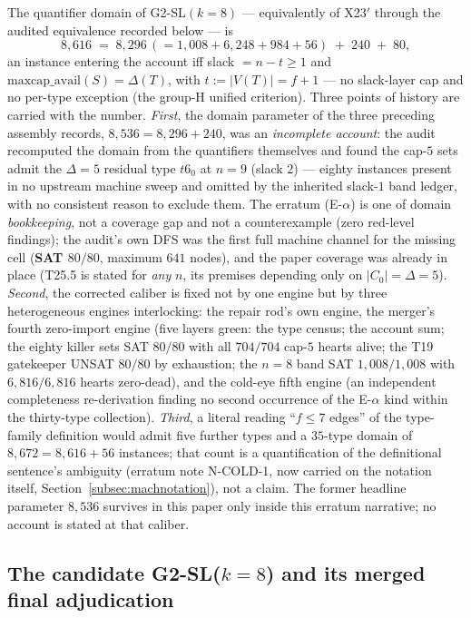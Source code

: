 The quantifier domain of G2-SL$(k{=}8)$ --- equivalently of X23$'$ through the audited
equivalence recorded below --- is
\[
8{,}616 \;=\; 8{,}296\,(=1{,}008+6{,}248+984+56)\;+\;240\;+\;80 ,
\]
an instance entering the account iff slack $=n-t\ge1$ and
$\mathrm{maxcap\_avail}(S)=\Delta(T)$, with $t:=|V(T)|=f+1$ --- no slack-layer cap and no
per-type exception (the group-H unified criterion). Three points of history are carried with
the number. \emph{First}, the domain parameter of the three preceding assembly records,
$8{,}536=8{,}296+240$, was an \emph{incomplete account}: the audit recomputed the domain from
the quantifiers themselves and found the cap-$5$ sets admit the $\Delta=5$ residual type
$t6_0$ at $n=9$ (slack $2$) --- eighty instances present in no upstream machine sweep and
omitted by the inherited slack-$1$ band ledger, with no consistent reason to exclude them.
The erratum (E-$\alpha$) is one of domain \emph{bookkeeping}, not a coverage gap and not a
counterexample (zero red-level findings); the audit's own DFS was the first full machine
channel for the missing cell (\textbf{SAT $80/80$}, maximum $641$ nodes), and the paper
coverage was already in place (T25.5 is stated for \emph{any} $n$, its premises depending
only on $|C_0|=\Delta=5$). \emph{Second}, the corrected caliber is fixed not by one engine
but by three heterogeneous engines interlocking: the repair rod's own engine, the merger's
fourth zero-import engine (five layers green: the type census; the account sum; the eighty
killer sets SAT $80/80$ with all $704/704$ cap-$5$ hearts alive; the T19 gatekeeper UNSAT
$80/80$ by exhaustion; the $n=8$ band SAT $1{,}008/1{,}008$ with $6{,}816/6{,}816$ hearts
zero-dead), and the cold-eye fifth engine (an independent completeness re-derivation finding
no second occurrence of the E-$\alpha$ kind within the thirty-type collection). \emph{Third},
a literal reading ``$f\le7$ edges'' of the type-family definition would admit five further
types and a $35$-type domain of $8{,}672=8{,}616+56$ instances; that count is a
quantification of the definitional sentence's ambiguity (erratum note N-COLD-1, now carried
on the notation itself, Section~\ref{subsec:machnotation}), not a claim. The former headline
parameter $8{,}536$ survives in this paper only inside this erratum narrative; no account is
stated at that caliber.

\subsection{The candidate G2-SL(\texorpdfstring{$k=8$}{k=8}) and its merged final
adjudication}\label{subsec:g2sl}

